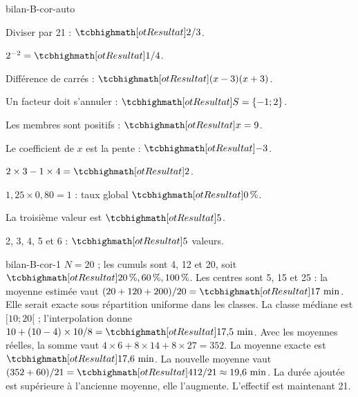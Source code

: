 \begin{blocEdition}{bilan-B-cor-auto}
\begin{questions}
\item Diviser par 21 : $\res{2/3}$.
\item $2^{-2}=\res{1/4}$.
\item Différence de carrés : $\res{(x-3)(x+3)}$.
\item Un facteur doit s’annuler : $\res{S=\{-1;2\}}$.
\item Les membres sont positifs : $\res{x=9}$.
\item Le coefficient de $x$ est la pente : $\res{-3}$.
\item $2\times3-1\times4=\res2$.
\item $1{,}25\times0{,}80=1$ : taux global $\res{0\,\%}$.
\item La troisième valeur est $\res5$.
\item 2, 3, 4, 5 et 6 : $\res5$ valeurs.
\end{questions}
\end{blocEdition}
\begin{blocEdition}{bilan-B-cor-1}
$N=20$ ; les cumuls sont 4, 12 et 20, soit $\res{20\,\%,60\,\%,100\,\%}$.
Les centres sont 5, 15 et 25 : la moyenne estimée vaut $(20+120+200)/20=\res{17\text{ min}}$. Elle serait exacte sous répartition uniforme dans les classes. La classe médiane est $[10;20[$ ; l’interpolation donne $10+(10-4)\times10/8=\res{17{,}5\text{ min}}$.
Avec les moyennes réelles, la somme vaut $4\times6+8\times14+8\times27=352$. La moyenne exacte est $\res{17{,}6\text{ min}}$.
La nouvelle moyenne vaut $(352+60)/21=\res{412/21\approx19{,}6\text{ min}}$. La durée ajoutée est supérieure à l’ancienne moyenne, elle l’augmente. L’effectif est maintenant 21.
\label{fig-bilan-B-cor-1}

\end{blocEdition}
